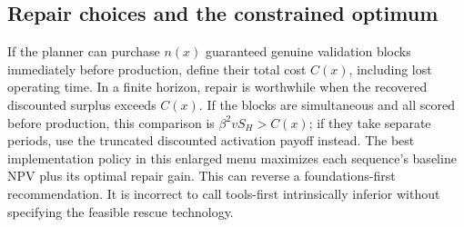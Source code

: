 \documentclass[11pt]{article}
\begin{document}
\subsection{Repair choices and the constrained optimum}
If the planner can purchase $n(x)$ guaranteed genuine validation blocks immediately before production, define their total cost $C(x)$, including lost operating time. In a finite horizon, repair is worthwhile when the recovered discounted surplus exceeds $C(x)$. If the blocks are simultaneous and all scored before production, this comparison is $\beta^2vS_H>C(x)$; if they take separate periods, use the truncated discounted activation payoff instead. The best implementation policy in this enlarged menu maximizes each sequence's baseline NPV plus its optimal repair gain. This can reverse a foundations-first recommendation. It is incorrect to call tools-first intrinsically inferior without specifying the feasible rescue technology.
\end{document}
